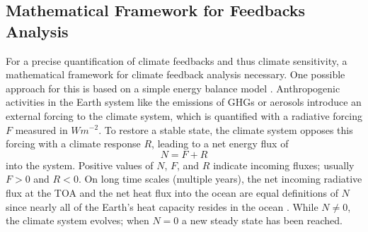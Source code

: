 \subsection{Mathematical Framework for Feedbacks Analysis}
\label{subsec:02:mathematical_framework_feedbacks}

For a precise quantification of climate feedbacks and thus climate sensitivity,
a mathematical framework for climate feedback analysis necessary. One possible
approach for this is based on a simple energy balance model
\autocite{Gregory2009, Roe2009}. Anthropogenic activities in the Earth system
like the emissions of \acp{GHG} or aerosols introduce an external forcing to
the climate system, which is quantified with a radiative forcing $F$ measured
in $\si{W m^{-2}}$. To restore a stable state, the climate system opposes this
forcing with a climate response $R$, leading to a net energy flux of
\begin{equation}
  N = F + R
  \label{eq:02:N}
\end{equation}
into the system. Positive values of $N$, $F$, and $R$ indicate incoming fluxes;
usually $F > 0$ and $R < 0$. On long time scales (multiple years), the net
incoming radiative flux at the \ac{TOA} and the net heat flux into the ocean
are equal definitions of $N$ since nearly all of the Earth's heat capacity
resides in the ocean \autocite{Gregory2009}. While $N \neq 0$, the climate
system evolves; when $N = 0$ a new steady state has been reached.

